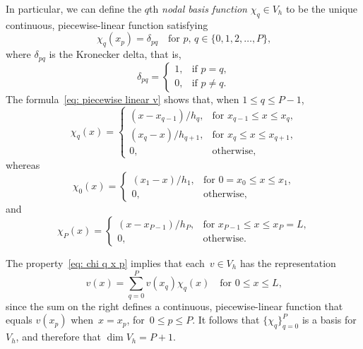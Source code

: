 In particular, we can define the $q$th \emph{nodal basis function} 
$\chi_q\in V_h$ to be the unique continuous, piecewise-linear function 
satisfying
\begin{equation}\label{eq: chi q x p}
\chi_q(x_p)=\delta_{pq}\quad\text{for $p$, $q\in\{0, 1, 2, \ldots, P\}$,}
\end{equation}
where $\delta_{pq}$ is the Kronecker delta, that is,
\[
\delta_{pq}=\begin{cases}
1,&\text{if $p=q$,}\\ 0,&\text{if $p\ne q$.} 
\end{cases}
\]
The formula~\eqref{eq: piecewise linear v} shows that, when $1\le q\le P-1$,
\begin{equation}\label{eq: chi_q formula}
\chi_q(x)=\begin{cases}
	(x-x_{q-1})/h_q,&\text{for $x_{q-1}\le x\le x_q$,}\\
	(x_q-x)/h_{q+1},&\text{for $x_q\le x\le x_{q+1}$,}\\
	0,&\text{otherwise,}
\end{cases}
\end{equation}
whereas
\[
\chi_0(x)=\begin{cases}
	(x_1-x)/h_1,&\text{for $0=x_0\le x\le x_1$,}\\
	0,&\text{otherwise,}
\end{cases}
\]
and 
\[
\chi_P(x)=\begin{cases}
	(x-x_{P-1})/h_P,&\text{for $x_{P-1}\le x\le x_P=L$,}\\
	0,&\text{otherwise.}
\end{cases}
\]

The property~\eqref{eq: chi q x p} implies that each~$v\in V_h$ has the 
representation
\[
v(x)=\sum_{q=0}^P v(x_q)\chi_q(x)\quad\text{for $0\le x\le L$,}
\]
since the sum on the right defines a continuous, piecewise-linear function that 
equals $v(x_p)$ when~$x=x_p$, for~$0\le p\le P$.  It follows that 
$\{\chi_q\}_{q=0}^P$ is a basis for~$V_h$, and therefore that $\dim V_h=P+1$.

